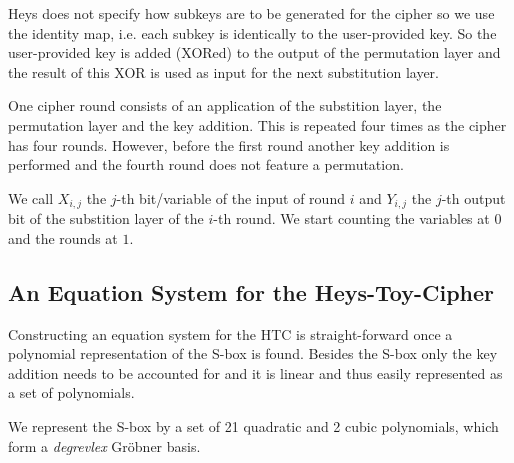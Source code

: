 Heys does not specify how subkeys are to be generated for the cipher so we use the identity map, i.e. each subkey is identically to the user-provided key. So the user-provided key  is added (XORed) to the output of the permutation layer and the result of this XOR is used as input for the next substitution layer.

One cipher round consists of an application of the substition layer, the permutation layer and the key addition. This is repeated four times as the cipher has four rounds. However, before the first round another key addition is performed and the fourth round does not feature a permutation.

We call $X_{i,j}$ the $j$-th bit/variable of the input of round $i$ and $Y_{i,j}$ the $j$-th output bit of the substition layer of the $i$-th round. We start counting the variables at $0$ and the rounds at $1$.


\subsection{An Equation System for the Heys-Toy-Cipher}

Constructing an equation system for the HTC is straight-forward once a polynomial representation of the S-box is found. Besides the S-box only the key addition needs to be accounted for and it is linear and thus easily represented as a set of polynomials.
                                                            
We represent the S-box by a set of 21 quadratic and 2 cubic polynomials, which form a \emph{degrevlex} Gröbner basis.

